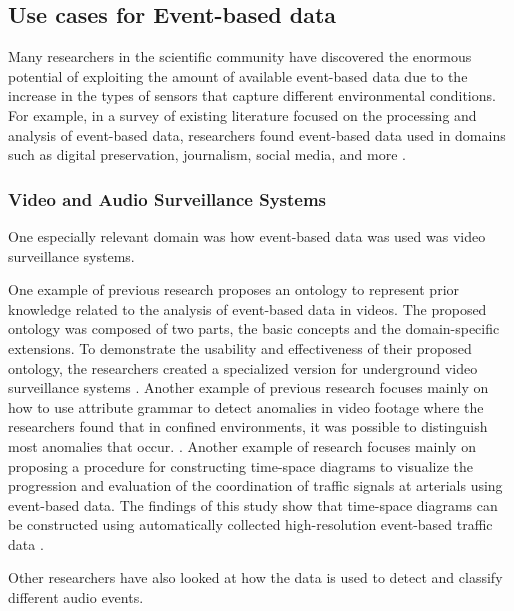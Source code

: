 \documentclass[doublespace,draft,nopageskip]{VTthesis} %
\begin{document}
\subsection{Use cases for Event-based data} \label{ss:this_subsection}

Many researchers in the scientific community have discovered the enormous potential of exploiting the amount of available event-based data due to the increase in the types of sensors that capture different environmental conditions. For example, in a survey of existing literature focused on the processing and analysis of event-based data,  researchers found event-based data used in domains such as digital preservation, journalism, social media, and more \cite{tzelepisEventbasedMediaProcessing2016}.

\subsubsection{Video and Audio Surveillance Systems}
One especially relevant domain was how event-based data was used was video surveillance systems. 

One example of previous research proposes an ontology to represent prior knowledge related to the analysis of event-based data in videos. The proposed ontology was composed of two parts, the basic concepts and the domain-specific extensions. To demonstrate the usability and effectiveness of their proposed ontology, the researchers created a specialized version for underground video surveillance systems \cite{sanmiguelOntologyEventDetection2009}.
Another example of previous research focuses mainly on how to use attribute grammar to detect anomalies in video footage where the researchers found that in confined environments, it was possible to distinguish most anomalies that occur. \cite{seong-wookjooAttributeGrammarBasedEvent2006}. 
Another example of research focuses mainly on proposing a procedure for constructing time-space diagrams to visualize the progression and evaluation of the coordination of traffic signals at arterials using event-based data. The findings of this study show that time-space diagrams can be constructed using automatically collected high-resolution event-based traffic data \cite{zhengUseEventBasedTraffic2014}.

Other researchers have also looked at how the data is used to detect and classify different audio events. 
\end{document}
